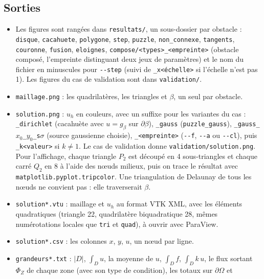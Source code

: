 \documentclass[11pt,a4paper]{article}
\begin{document}
\subsection{Sorties}

\begin{itemize}
  \item Les figures sont rangées dans \texttt{resultats/}, un sous-dossier
        par obstacle : \texttt{disque}, \texttt{cacahuete}, \texttt{polygone},
        \texttt{step}, \texttt{puzzle}, \texttt{non\_connexe},
        \texttt{tangents}, \texttt{couronne}, \texttt{fusion}, \texttt{eloignes},
        \texttt{compose/\allowbreak<types>\_\allowbreak<empreinte>} (obstacle
        composé, l'empreinte distinguant deux jeux de paramètres) et le nom
        du fichier en minuscules pour \texttt{-{}-step} (suivi de
        \texttt{\_x<échelle>} si l'échelle n'est pas 1). Les figures du cas de
        validation sont dans \texttt{validation/}.
  \item \texttt{maillage.png} : les quadrilatères, les triangles et $\beta$,
        un seul par obstacle.
  \item \texttt{solution.png} : $u_h$ en couleurs, avec un suffixe pour les
        variantes du cas : \texttt{\_dirichlet} (cacahuète avec
        $u = g_\beta$ sur $\partial\beta$), \texttt{\_gauss}
        (\texttt{puzzle\_gauss}), \texttt{\_gauss\_$x_0$\_$y_0$\_s$\sigma$}
        (source gaussienne choisie), \texttt{\_<empreinte>} (\texttt{-{}-f},
        \texttt{-{}-a} ou \texttt{-{}-cl}), puis \texttt{\_k<valeur>} si $k \ne 1$.
        Le cas de validation donne \texttt{validation/solution.png}. Pour l'affichage, chaque
        triangle $P_2$ est découpé en 4 sous-triangles et chaque carré $Q_2$
        en 8 à l'aide des nœuds milieux, puis on trace le résultat avec
        \texttt{matplotlib.pyplot.tripcolor}. Une triangulation de Delaunay
        de tous les nœuds ne convient pas : elle traverserait $\beta$.
  \item \texttt{solution*.vtu} : maillage et $u_h$ au format VTK XML, avec
        les éléments quadratiques (triangle 22, quadrilatère biquadratique 28,
        mêmes numérotations locales que \texttt{tri} et \texttt{quad}), à
        ouvrir avec ParaView.
  \item \texttt{solution*.csv} : les colonnes $x$, $y$, $u$, un nœud par ligne.
  \item \texttt{grandeurs*.txt} : $|D|$, $\int_D u$, la moyenne de $u$,
        $\int_D f$, $\int_D k\, u$, le flux sortant $\Phi_Z$ de chaque zone
        (avec son type de condition), les totaux sur $\partial\Omega$ et

\end{itemize}
\end{document}
